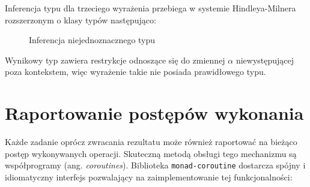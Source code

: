Inferencja typu dla trzeciego wyrażenia przebiega w systemie Hindleya-Milnera\cite{HM} rozszerzonym o klasy typów\cite{TC} następująco:
\begin{figure}[h]
\scriptsize 
\begin{mdframed}
\begin{prooftree}
 
  
  

\end{prooftree}
\end{mdframed}
\caption{Inferencja niejednoznacznego typu}
\end{figure}

Wynikowy typ zawiera restrykcje odnoszące się do zmiennej $\alpha$ niewystępującej poza kontekstem, więc wyrażenie takie nie posiada prawidłowego typu\cite{Report}.

\section{Raportowanie postępów wykonania}
Każde zadanie oprócz zwracania rezultatu może również raportować na bieżąco postęp wykonywanych operacji. Skuteczną metodą obsługi tego mechanizmu są współprogramy (ang. \textit{coroutines}). Biblioteka \texttt{monad-coroutine}\cite{Coroutine} dostarcza spójny i idiomatyczny interfejs pozwalający na zaimplementowanie tej funkcjonalności:

